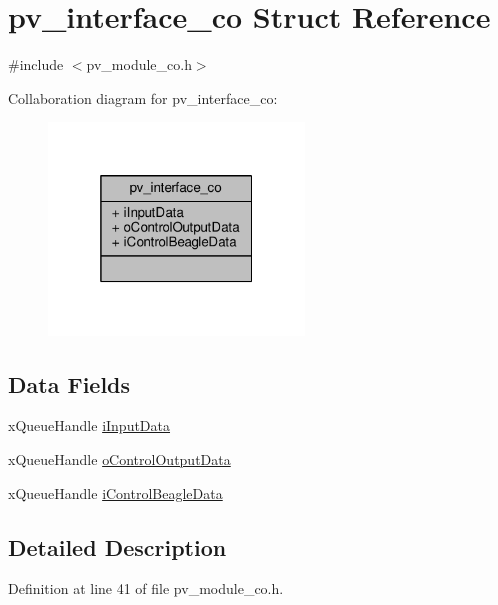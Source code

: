 \hypertarget{structpv__interface__co}{}\section{pv\+\_\+interface\+\_\+co Struct Reference}
\label{structpv__interface__co}


{\ttfamily \#include $<$pv\+\_\+module\+\_\+co.\+h$>$}



Collaboration diagram for pv\+\_\+interface\+\_\+co\+:\nopagebreak
\begin{figure}[H]
\begin{center}
\leavevmode
\includegraphics[width=193pt]{structpv__interface__co__coll__graph}
\end{center}
\end{figure}
\subsection*{Data Fields}
\begin{DoxyCompactItemize}
\item 
x\+Queue\+Handle \hyperlink{structpv__interface__co_ad057767ef15274f0933ad1821fea7239}{i\+Input\+Data}
\item 
x\+Queue\+Handle \hyperlink{structpv__interface__co_adeb92ab25c31742c709ae51f96cbf10a}{o\+Control\+Output\+Data}
\item 
x\+Queue\+Handle \hyperlink{structpv__interface__co_a0d6eb6afadef31d21002472d9e7266f9}{i\+Control\+Beagle\+Data}
\end{DoxyCompactItemize}


\subsection{Detailed Description}


Definition at line 41 of file pv\+\_\+module\+\_\+co.\+h.



